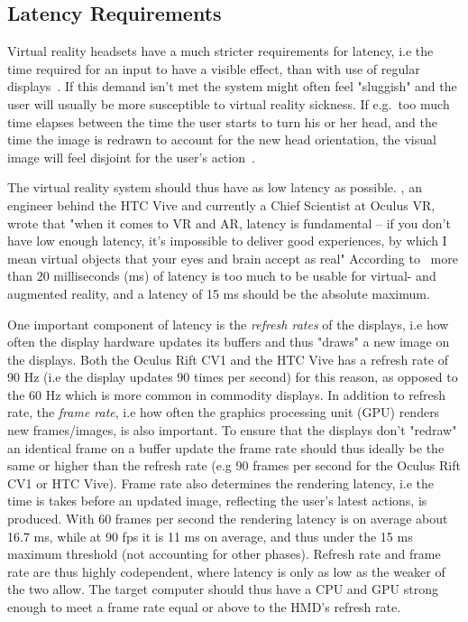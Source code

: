 \subsection{Latency Requirements}
\label{sec:latency_requirements}
Virtual reality headsets have a much stricter requirements for latency, i.e the time required for an input to have a visible effect, 
than with use of regular displays~\citep{ROADTOVR2013}. If this demand isn't met the system might often feel "sluggish" and the user will usually be more susceptible to
virtual reality sickness. %
If e.g.~too much time elapses between the time the user starts to turn his or her head, and the time 
the image is redrawn to account for the new head orientation, the visual image will feel disjoint for the user's action~\citep{Abrash2012}.

The virtual reality system should thus have as low latency as possible. 
\citet{Abrash2012}, an engineer behind the HTC Vive and currently a Chief Scientist at Oculus VR, wrote that "when it comes to VR and AR, latency is fundamental – 
if you don’t have low enough latency, it’s impossible to deliver good experiences, by which I mean virtual objects that your eyes and brain accept as real"
According to~\citet{Abrash2012} more than 20 milliseconds (ms) of latency is too much to be usable for virtual- and augmented reality, 
and a latency of 15 ms should be the absolute maximum.

One important component of latency is the \textit{refresh rates} of the displays, i.e 
how often the display hardware updates its buffers and thus "draws" a new image on the displays. Both the Oculus Rift CV1 and the HTC Vive
has a refresh rate of 90 Hz (i.e the display updates 90 times per second) for this reason, as opposed to the 60 Hz which is more common in commodity displays.
In addition to refresh rate, the \textit{frame rate}, i.e how often the graphics processing unit (GPU) renders new frames/images, is also important. To ensure 
that the displays don't "redraw" an identical frame on a buffer update the frame rate should thus ideally be the same or higher than the refresh 
rate (e.g 90 frames per second for the Oculus Rift CV1 or HTC Vive). Frame rate also determines the rendering latency, i.e the time is takes before 
an updated image, reflecting the user's latest actions, is produced. With 60 frames per second the rendering latency is on average about 16.7 ms, while at 90 fps it is 
11 ms on average, and thus under the 15 ms maximum threshold (not accounting for other phases). %
Refresh rate and frame rate are thus highly codependent, where latency is only as low as the weaker of the two allow. 
The target computer should thus have a CPU and GPU strong enough to meet a frame rate equal or above to the HMD's refresh rate. 

